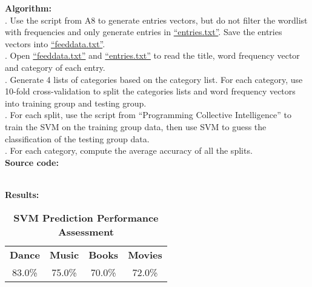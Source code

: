 \documentclass{article}
\begin{document}
		\noindent\textbf{Algorithm:}\\
		. Use the script from A8 to generate entries vectors, but do not filter the wordlist with frequencies and only generate entries in \href{https://github.com/zhangboroy/cs532-s17/blob/master/assg10_submission/entries.txt}{``entries.txt''}. Save the entries vectors into \href{https://github.com/zhangboroy/cs532-s17/blob/master/assg10_submission/feeddata.txt}{``feeddata.txt''}.\\
		. Open \href{https://github.com/zhangboroy/cs532-s17/blob/master/assg10_submission/feeddata.txt}{``feeddata.txt''} and \href{https://github.com/zhangboroy/cs532-s17/blob/master/assg10_submission/entries.txt}{``entries.txt''} to read the title, word frequency vector and category of each entry.\\
		. Generate 4 lists of categories based on the category list. For each category, use 10-fold cross-validation to split the categories lists and word frequency vectors into training group and testing group.\\
		. For each split, use the script from ``Programming Collective Intelligence'' to train the SVM on the training group data, then use SVM to guess the classification of the testing group data.\\
		. For each category, compute the average accuracy of all the splits.\\

		\noindent\textbf{Source code:}
		
		

		\noindent\\\textbf{Results:}
		\begin{table}[!htb]
			\centering
			\caption{\textbf{SVM Prediction Performance Assessment}}
			\begin{tabular}{cccc}
				\toprule
				\textbf{Dance} & \textbf{Music} & \textbf{Books} & \textbf{Movies}\\
				83.0\% & 75.0\% & 70.0\% & 72.0\%\\
				\bottomrule
			\end{tabular}
		\end{table}
	
\end{document}
